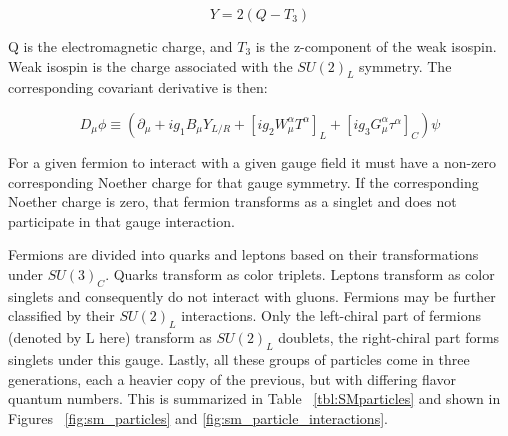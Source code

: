 \begin{equation}
Y= 2(Q-T_{3})
\end{equation}

Q is the electromagnetic charge, and $ T_{3}$ is the z-component of the weak isospin. Weak isospin is the charge associated with the $SU(2)_{L}$ symmetry. The corresponding covariant derivative is then:

\begin{equation}
D_{\mu}\phi \equiv (\partial_{\mu} + ig_{1}B_{\mu}Y_{L/R} + [ig_{2}W^{\alpha}_{\mu}T^{\alpha}]_{L} + [ig_{3}G^{\alpha}_{\mu}\tau^{\alpha}]_{C})\psi
\end{equation}

For a given fermion to interact with a given gauge field it must have a non-zero corresponding Noether charge for that gauge symmetry. If the corresponding Noether charge is zero, that fermion transforms as a singlet and does not participate in that gauge interaction. 

Fermions are divided into quarks and leptons based on their transformations under $SU(3)_{C}$. Quarks transform as color triplets. Leptons transform as color singlets and consequently do not interact with gluons. 
Fermions may be further classified by their $SU(2)_{L}$ interactions. Only the left-chiral part of fermions (denoted by L here) transform as $SU(2)_{L}$ doublets, the right-chiral part forms singlets under this gauge. Lastly, all these groups of particles come in three generations, each a heavier copy of the previous, but with differing flavor quantum numbers. This is summarized in Table ~\ref{tbl:SMparticles} and shown in Figures ~\ref{fig:sm_particles} and \ref{fig:sm_particle_interactions}.

